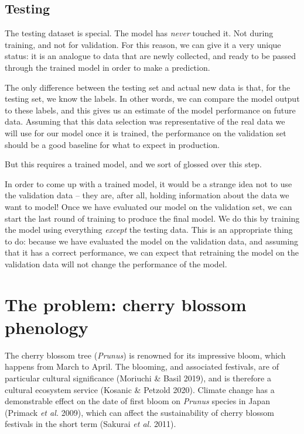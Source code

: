 \documentclass[
  letterpaper,
]{scrbook}
\begin{document}
\subsection{Testing}\label{sec-crossvalidation-testing}

The testing dataset is special. The model has \emph{never} touched it.
Not during training, and not for validation. For this reason, we can
give it a very unique status: it is an analogue to data that are newly
collected, and ready to be passed through the trained model in order to
make a prediction.

The only difference between the testing set and actual new data is that,
for the testing set, we know the labels. In other words, we can compare
the model output to these labels, and this gives us an estimate of the
model performance on future data. Assuming that this data selection was
representative of the real data we will use for our model once it is
trained, the performance on the validation set should be a good baseline
for what to expect in production.

But this requires a trained model, and we sort of glossed over this
step.

In order to come up with a trained model, it would be a strange idea not
to use the validation data -- they are, after all, holding information
about the data we want to model! Once we have evaluated our model on the
validation set, we can start the last round of training to produce the
final model. We do this by training the model using everything
\emph{except} the testing data. This is an appropriate thing to do:
because we have evaluated the model on the validation data, and assuming
that it has a correct performance, we can expect that retraining the
model on the validation data will not change the performance of the
model.

\section{The problem: cherry blossom
phenology}\label{the-problem-cherry-blossom-phenology}

The cherry blossom tree (\emph{Prunus}) is renowned for its impressive
bloom, which happens from March to April. The blooming, and associated
festivals, are of particular cultural significance (Moriuchi \& Basil
2019), and is therefore a cultural ecosystem service (Kosanic \& Petzold
2020). Climate change has a demonstrable effect on the date of first
bloom on \emph{Prunus} species in Japan (Primack \emph{et al.} 2009),
which can affect the sustainability of cherry blossom festivals in the
short term (Sakurai \emph{et al.} 2011).
\end{document}
